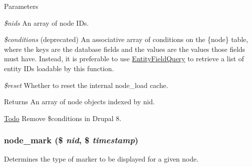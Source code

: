 \begin{DoxyParams}{Parameters}
\item[{\em \$nids}]An array of node IDs. \item[{\em \$conditions}](deprecated) An associative array of conditions on the \{node\} table, where the keys are the database fields and the values are the values those fields must have. Instead, it is preferable to use \hyperlink{classEntityFieldQuery}{EntityFieldQuery} to retrieve a list of entity IDs loadable by this function. \item[{\em \$reset}]Whether to reset the internal node\_\-load cache.\end{DoxyParams}
\begin{DoxyReturn}{Returns}
An array of node objects indexed by nid.
\end{DoxyReturn}
\begin{Desc}
\item[\hyperlink{todo__todo000018}{Todo}]Remove \$conditions in Drupal 8. \end{Desc}
\hypertarget{node_8module_a33745a626aae6ed3852904a34d587c57}{
\subsubsection[{node\_\-mark}]{\setlength{\rightskip}{0pt plus 5cm}node\_\-mark (\$ {\em nid}, \/  \$ {\em timestamp})}}
\label{node_8module_a33745a626aae6ed3852904a34d587c57}
Determines the type of marker to be displayed for a given node.


